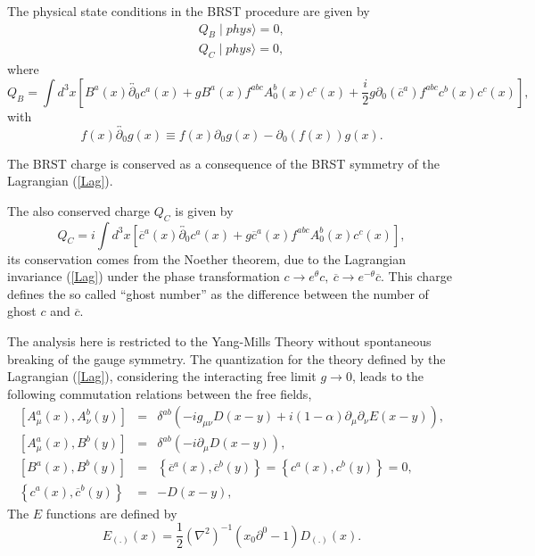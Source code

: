 \documentclass[12pt,letterpaper]{report}
\begin{document}
The physical state conditions in the BRST procedure
\cite{OjimaTex} are given by
\begin{eqnarray}
&&Q_B\mid phys\rangle =0, \nonumber \\ &&Q_C\mid phys\rangle =0,
\end{eqnarray}
where
\[
Q_B=\int d^3x\left[ B^a\left(x\right) \overleftrightarrow{\partial
_0} c^a\left(x\right) +gB^a\left(x\right) f^{abc}A_0^b\left(
x\right) c^c\left(x\right) +\frac i2g\partial _0\left(
\overline{c}^a\right) f^{abc}c^b\left(x\right) c^c\left(x\right)
\right],
\]
with
\[
f\left(x\right) \overleftrightarrow{\partial _0}g\left(x\right)
\equiv f\left(x\right) \partial _0g\left(x\right) -\partial
_0\left(f\left(x\right) \right) g\left(x\right).
\]

The BRST charge is conserved as a consequence of the BRST symmetry
of the Lagrangian (\ref{Lag}).

The also conserved charge $Q_C$ is given by
\[
Q_C=i\int d^3x\left[ \overline{c}^a\left(x\right)
\overleftrightarrow{
\partial _0}c^a\left(x\right) +g\overline{c}^a\left(x\right)
f^{abc}A_0^b\left(x\right) c^c\left(x\right) \right],
\]
its conservation comes from the Noether theorem, due to the
Lagrangian invariance (\ref{Lag}) under the phase transformation
$c\rightarrow e^\theta c,\ \overline{c}\rightarrow e^{-\theta
}\overline{c}$. This charge defines the so called ``ghost number''
as the difference between the number of ghost $c$ and
$\overline{c}$.

The analysis here is restricted to the Yang-Mills Theory without
spontaneous breaking of the gauge symmetry. The quantization for
the theory defined by the Lagrangian (\ref{Lag}), considering the
interacting free limit $g\rightarrow 0$, leads to the following
commutation relations between the free fields,
\begin{eqnarray}
\left[ A_\mu ^a\left(x\right),A_\nu ^b\left(y\right) \right]
&=&\delta ^{ab}\left(-ig_{\mu \nu }D\left(x-y\right) +i\left(
1-\alpha \right) \partial _\mu \partial _\nu E\left(x-y\right)
\right), \nonumber \\ \left[ A_\mu ^a\left(x\right),B^b\left(
y\right) \right] &=&\delta ^{ab}\left(-i\partial _\mu D\left(
x-y\right) \right), \nonumber \\ \left[ B^a\left(
x\right),B^b\left(y\right) \right] &=&\left\{ \overline{c}
^a\left(x\right),\overline{c}^b\left(y\right) \right\} =\left\{
c^a\left(x\right),c^b\left(y\right) \right\} =0, \nonumber \\
\left\{ c^a\left(x\right),\overline{c}^b\left(y\right) \right\}
&=&-D\left(x-y\right), \label{com}
\end{eqnarray}
The $E$ functions are defined by \cite{OjimaTex}
\[
E_{\left(.\right) }\left(x\right) =\frac 12\left(\nabla ^2\right)
^{-1}\left(x_0\partial ^0-1\right) D_{\left(.\right) }\left(
x\right).
\]
\end{document}
